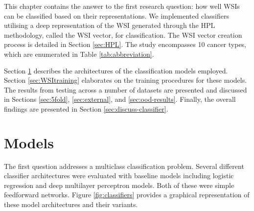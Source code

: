 \documentclass{l4proj}
\begin{document}
This chapter contains the answer to the first research question: how well WSIs can be classified based on their representations. We implemented classifiers utilising a deep representation of the WSI generated through the HPL methodology, called the WSI vector, for classification. The WSI vector creation process is detailed in Section \ref{sec:HPL}. The study encompasses 10 cancer types, which are enumerated in Table \ref{tab:abbreviation}.

Section \ref{sec:WSImodel} describes the architectures of the classification models employed. Section \ref{sec:WSItraining} elaborates on the training procedures for these models. The results from testing across a number of datasets are presented and discussed in Sections \ref{sec:5fold}, \ref{sec:external}, and \ref{sec:ood-results}. Finally, the overall findings are presented in Section \ref{sec:discuss-classifier}. 

\section{Models} \label{sec:WSImodel}
The first question addresses a multiclass classification problem. Several different classifier architectures were evaluated with baseline models including logistic regression and deep multilayer perceptron models. Both of these were simple feedforward networks. Figure \ref{fig:classifiers} provides a graphical representation of these model architectures and their variants.
\end{document}
